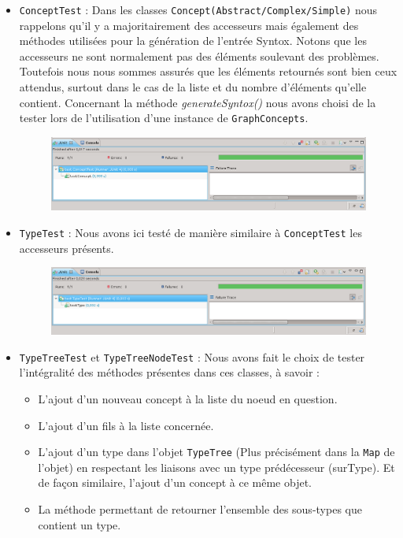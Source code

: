 \documentclass[12pt]{report}
\begin{document}
\begin{itemize}	
\item \texttt{ConceptTest} : Dans les classes \texttt{Concept(Abstract/Complex/Simple)} nous rappelons qu'il y a majoritairement des accesseurs mais également des méthodes utilisées pour la génération de l'entrée Syntox. Notons que les accesseurs ne sont normalement pas des éléments soulevant des problèmes. Toutefois nous nous sommes assurés que les éléments retournés sont bien ceux attendus, surtout dans le cas de la liste et du nombre d'éléments qu'elle contient.
Concernant la méthode \emph{generateSyntox()} nous avons choisi de la tester lors de l'utilisation d'une instance de \texttt{GraphConcepts}.
\begin{figure}
\begin{center}
	\includegraphics[scale=0.40]{resultatTest1.png}
\end{center}
\end{figure}

\item \texttt{TypeTest} : Nous avons ici testé de manière similaire à \texttt{ConceptTest} les accesseurs présents. 
\begin{figure}[h!]
\begin{center}
	\includegraphics[scale=0.40]{resultatTest6.png}
\end{center}
\end{figure}

\item \texttt{TypeTreeTest} et \texttt{TypeTreeNodeTest} : Nous avons fait le choix de tester l'intégralité des méthodes présentes dans ces classes, à savoir :
	\begin{itemize}
	\item L'ajout d'un nouveau concept à la liste du noeud en question. 
	\item L'ajout d'un fils à la liste concernée.
	\item L'ajout d'un type dans l'objet \texttt{TypeTree} (Plus précisément dans la \texttt{Map} de l'objet) en respectant les liaisons avec un type prédécesseur (surType). Et de façon similaire, l'ajout d'un concept à ce même objet.
	\item La méthode permettant de retourner l'ensemble des sous-types que contient un type. 
	\end{itemize}
	

\end{itemize}
\end{document}
